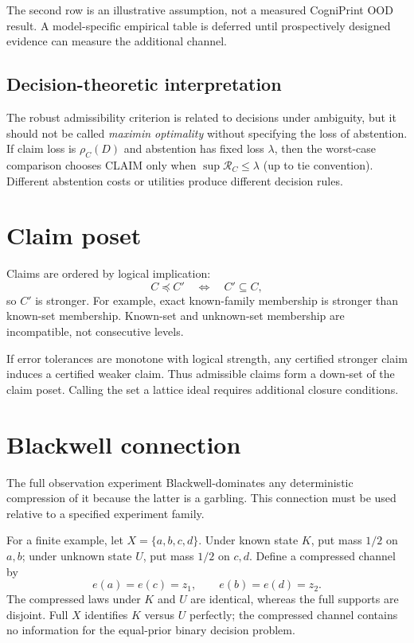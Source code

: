 \documentclass[11pt]{article}
\begin{document}
The second row is an illustrative assumption, not a measured CogniPrint OOD
result. A model-specific empirical table is deferred until prospectively
designed evidence can measure the additional channel.

\subsection{Decision-theoretic interpretation}

The robust admissibility criterion is related to decisions under ambiguity,
but it should not be called \emph{maximin optimality} without specifying the
loss of abstention. If claim loss is $\rho_C(D)$ and abstention has fixed loss
$\lambda$, then the worst-case comparison chooses CLAIM only when
$\sup\mathcal R_C\le\lambda$ (up to tie convention). Different abstention
costs or utilities produce different decision rules.

\section{Claim poset}

Claims are ordered by logical implication:
\[
C\preceq C'
\quad\Longleftrightarrow\quad
C'\subseteq C,
\]
so $C'$ is stronger. For example, exact known-family membership is stronger
than known-set membership. Known-set and unknown-set membership are
incompatible, not consecutive levels.

If error tolerances are monotone with logical strength, any certified stronger
claim induces a certified weaker claim. Thus admissible claims form a down-set
of the claim poset. Calling the set a lattice ideal requires additional
closure conditions.

\section{Blackwell connection}

The full observation experiment Blackwell-dominates any deterministic
compression of it because the latter is a garbling. This connection must be
used relative to a specified experiment family.

For a finite example, let $X=\{a,b,c,d\}$. Under known state $K$, put mass
$1/2$ on $a,b$; under unknown state $U$, put mass $1/2$ on $c,d$. Define a
compressed channel by
\[
e(a)=e(c)=z_1,\qquad e(b)=e(d)=z_2.
\]
The compressed laws under $K$ and $U$ are identical, whereas the full supports
are disjoint. Full $X$ identifies $K$ versus $U$ perfectly; the compressed
channel contains no information for the equal-prior binary decision problem.
\end{document}
